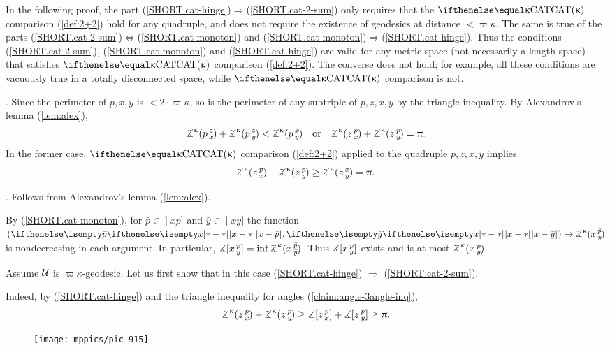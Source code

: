 \label{22remark}
In the following proof, the part (\ref{SHORT.cat-hinge})$\Rightarrow$(\ref{SHORT.cat-2-sum})
only requires that the $\CAT\kappa$ comparison (\ref{def:2+2}) hold for any quadruple, and does not require the existence of geodesics at distance $<\varpi\kappa$. 
The same is true of the parts (\ref{SHORT.cat-2-sum})$\Leftrightarrow$(\ref{SHORT.cat-monoton}) and
(\ref{SHORT.cat-monoton})$\Rightarrow$(\ref{SHORT.cat-hinge}).  
Thus the conditions (\ref{SHORT.cat-2-sum}), (\ref{SHORT.cat-monoton}) and (\ref{SHORT.cat-hinge}) are valid for any metric space (not necessarily a length space) that satisfies $\CAT\kappa$ comparison (\ref{def:2+2}). 
The converse does not hold; for example, all these conditions are 
vacuously true in a 
totally disconnected space, while 
$\CAT\kappa$ comparison is not.

. 
Since the perimeter of $p,x,y$ is $<2\cdot \varpi\kappa$, so is the perimeter of any subtriple of $p,z,x,y$ by the triangle inequality. 
By Alexandrov's lemma (\ref{lem:alex}), 
\[\angk\kappa p z x +\angk\kappa p z y  < \angk{\kappa} p x y \quad \text{or}\quad  \angk\kappa z p x  +\angk\kappa z p y  =\pi.\]
In the former case, $\CAT\kappa$ comparison (\ref{def:2+2}) applied to the quadruple $p, z, x, y$ implies
\[\angk\kappa z p x  +\angk\kappa z p y  \ge \angk{\kappa} z x y =\pi.\]

\parit{(\ref{SHORT.cat-2-sum}) $\Leftrightarrow$ (\ref{SHORT.cat-monoton})}. Follows from  Alexandrov's lemma (\ref{lem:alex}).

By (\ref{SHORT.cat-monoton}), for $\bar p\in\mathopen{]}x p]$ and $\bar y\in\mathopen{]}x y]$ the function $(\dist{x}{\bar p}{},\dist{x}{\bar y}{})\mapsto\angk\kappa x{\bar p}{\bar y}$ is nondecreasing in each argument.
In particular, 
$\mangle\hinge x p y\z=\inf\angk\kappa x{\bar p}{\bar y}$.
Thus $\measuredangle[x\,{}^{p}_{y}]$ exists and is
at most $\angk\kappa x p y$. 

 Assume $\mathcal{U}$ is $\varpi\kappa$-geodesic. 
Let us first show that in this case (\ref{SHORT.cat-hinge}) $\Rightarrow$ (\ref{SHORT.cat-2-sum}).

Indeed, by (\ref{SHORT.cat-hinge}) and the triangle inequality for angles (\ref{claim:angle-3angle-inq}),
\[\angk\kappa z p x
+\angk\kappa z p y \ge \mangle\hinge z p x
+\mangle\hinge z p y \ge \pi.\]

\begin{wrapfigure}{r}{30 mm}
\vskip-0mm
\centering
\texttt{[image: mppics/pic-915]}
\end{wrapfigure}

